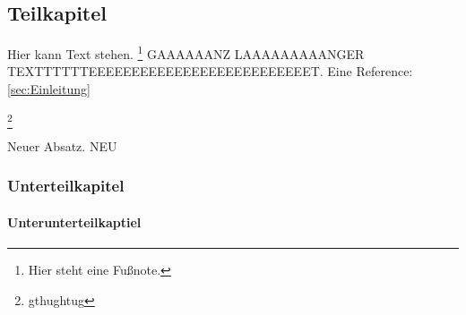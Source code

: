 \subsection{Teilkapitel}
\label{sec:Teilkapitel}



Hier kann Text stehen. \footnote{Hier steht eine Fußnote.}
GAAAAAANZ LAAAAAAAAANGER TEXTTTTTTEEEEEEEEEEEEEEEEEEEEEEEEEET.
Eine Reference: \ref{sec:Einleitung}

\footnote{gthughtug}

\noindent
Neuer Absatz. NEU
\subsubsection{Unterteilkapitel}
\label{sec:Unterteilkapitel}

\paragraph{Unterunterteilkaptiel}
\label{sec:Unterunterteilkaptiel}

